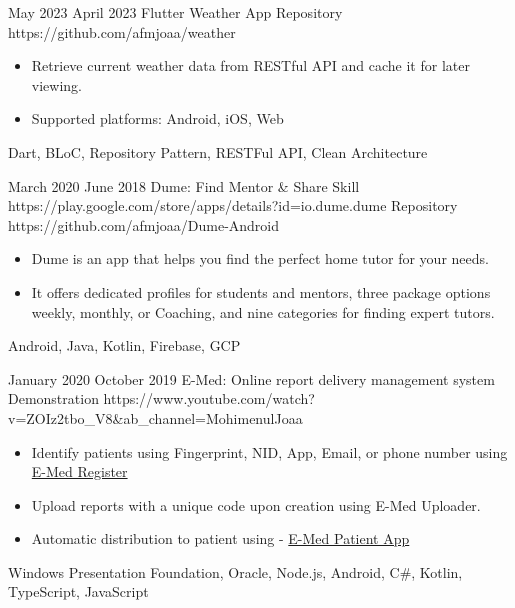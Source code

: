 \begin{universalList}
  \emptySeparator
  \universalListItemWithoutLink
    {May 2023}
    {April 2023}
    {Flutter Weather App}
    {Repository}
    {https://github.com/afmjoaa/weather}
    {
      \begin{itemize}
        \item Retrieve current weather data from RESTful API and cache it for later viewing.
        \item Supported platforms: Android, iOS, Web
      \end{itemize}
    }
    {Dart, BLoC, Repository Pattern, RESTFul API, Clean Architecture}

  \emptySeparator
  \universalListItem
    {March 2020}
    {June 2018}
    {Dume: Find Mentor \& Share Skill}
    {https://play.google.com/store/apps/details?id=io.dume.dume}
    {Repository}
    {https://github.com/afmjoaa/Dume-Android}
    {
      \begin{itemize}
        \item Dume is an app that helps you find the perfect home tutor for your needs.
        \item It offers dedicated profiles for students and mentors, three package options weekly, monthly, or Coaching, and nine categories for finding expert tutors.
      \end{itemize}
    }
    {Android, Java, Kotlin, Firebase, GCP}

  \emptySeparator
  \universalListItemWithoutLink
    {January 2020}
    {October 2019}
    {E-Med: Online report delivery management system}
    {Demonstration}
    {https://www.youtube.com/watch?v=ZOIz2tbo_V8&ab_channel=MohimenulJoaa}
    {
      \begin{itemize}
        \item Identify patients using Fingerprint, NID, App, Email, or phone number using \href{https://github.com/afmjoaa/E-Med-Uploader}{E-Med Register \linkIcon}
        \item Upload reports with a unique code upon creation using E-Med Uploader.
        \item Automatic distribution to patient using - \href{https://play.google.com/store/apps/details?id=io.emed.emedpatient}{E-Med Patient App \linkIcon}
      \end{itemize}
    }
    {Windows Presentation Foundation, Oracle, Node.js, Android, C\#, Kotlin, TypeScript, JavaScript}

\end{universalList}

